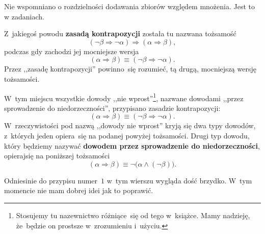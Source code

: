 \documentclass[a4paper,11pt]{article}
\begin{document}
Nie wspomniano o rozdzielności dodawania zbiorów względem mnożenia. Jest to w zadaniach.

 Z~jakiegoś powodu \textbf{zasadą kontrapozycji} została tu nazwana tożsamość
\begin{equation}
  \label{eq:Kuratowski-Wstep-do-teorii-mnogosci-ETC-01}
  ( \neg \beta \Rightarrow \neg \alpha ) \Rightarrow ( \alpha \Rightarrow \beta ),
\end{equation}
podczas gdy zachodzi jej mocniejsze wersja
\begin{equation}
  \label{eq:Kuratowski-Wstep-do-teorii-mnogosci-ETC-02}
  ( \alpha \Rightarrow \beta ) \equiv ( \neg \beta \Rightarrow \neg \alpha ).
\end{equation}
Przez ,,zasadę kontrapozycji'' powinno~się rozumieć, tą drugą, mocniejszą wersję tożsamości.

\vspace{\spaceFour}



 W~tym miejscu wszystkie dowody 
,,nie wprost''\footnote{Stosujemy tu nazewnictwo różniące~się od tego w~książce. 
Mamy nadzieję, że~będzie on prostsze w~zrozumieniu i~użyciu.}, nazwane dowodami 
,,przez sprowadzenie do niedorzeczności'', przypisano zasadzie kontrapozycji: 
\begin{equation}
  \label{eq:Kuratowski-Wstep-do-teorii-mnogosci-ETC-03}
  ( \alpha \Rightarrow \beta ) \equiv ( \neg \beta \Rightarrow \neg \alpha).
\end{equation}
W~rzeczywistości pod nazwą ,,dowody nie wprost'' kryją się dwa typy dowodów, z~których
jeden opiera~się na podanej powyżej tożsamości. Drugi typ dowodu, który będziemy nazywać 
\textbf{dowodem przez sprowadzenie do niedorzeczności}, opierajsię na poniższej tożsamości
\begin{equation}
  \label{eq:Kuratowski-Wstep-do-teorii-mnogosci-ETC-04}
  ( \alpha \Rightarrow \beta ) \equiv \neg \big( \alpha \land ( \neg \beta ) \big).
\end{equation}

\vspace{\spaceFour}





 Odniesinie do przypisu numer~$1$ w~tym wierszu wygląda dość brzydko. W~tym momencie 
nie mam dobrej idei jak to poprawić.

\vspace{\spaceFour}
\end{document}
